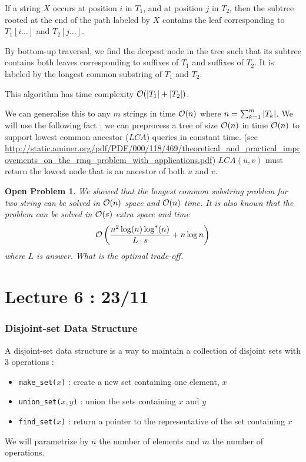 \documentclass{cours}
\newtheorem{openpb}{Open Problem}
\begin{document}
\begin{remark}
    If a string $X$ occurs at position $i$ in $T_{1}$, and at position $j$ in $T_{2}$, then the subtree rooted at the end of the path labeled by $X$ contains the leaf corresponding to $T_{1}[i\ldots]$ and $T_{2}[j \ldots]$.
\end{remark}

By bottom-up traversal, we find the deepest node in the tree such that its subtree contains both leaves corresponding to suffixes of $T_{1}$ and suffixes of $T_{2}$. It is labeled by the longest common substring of $T_{1}$ and $T_{2}$.
\begin{proposition}
    This algorithm has time complexity $\mathcal{O}(\left|T_{1}\right| + \left|T_{2}\right|)$.
\end{proposition}

We can generalise this to any $m$ strings in time $\mathcal{O}(n)$ where $n = \sum_{k = 1}^{m} \left|T_{k}\right|$. We will use the following fact : we can preprocess a tree of size $\mathcal{O}(n)$ in time $\mathcal{O}(n)$ to support lowest common ancestor ($LCA$) queries in constant time. (see \href{this}{http://static.aminer.org/pdf/PDF/000/118/469/theoretical_and_practical_improvements_on_the_rmq_problem_with_applications.pdf}) $LCA(u, v)$ must return the lowest node that is an ancestor of both $u$ and $v$.

\begin{openpb}
    We showed that the longest common substring problem for two string can be solved in $\mathcal{O}(n)$ space and $\mathcal{O}(n)$ time. It is also known that the problem can be solved in $\mathcal{O}(s)$ extra space and time 
    \[
        \mathcal{O}\left(\frac{n^{2}\log(n)\log^{*}(n)}{L\cdot s} + n \log n\right)
    \]
    where $L$ is answer.
    What is the optimal trade-off.
\end{openpb}

\part[Disjoint-Set Structure]{Lecture 6 : 23/11}
\section{Disjoint-set Data Structure}
\begin{definition}
    A disjoint-set data structure is a way to maintain a collection of disjoint sets with 3 operations : 
    \begin{itemize}
        \item \texttt{make_set($x$)} : create a new set containing one element, $x$
        \item \texttt{union_set($x, y$)} : union the sets containing $x$ and $y$
        \item \texttt{find_set($x$)} : return a pointer to the representative of the set containing $x$
    \end{itemize}
    We will parametrize by $n$ the number of elements and $m$ the number of operations.
\end{definition}
\end{document}
